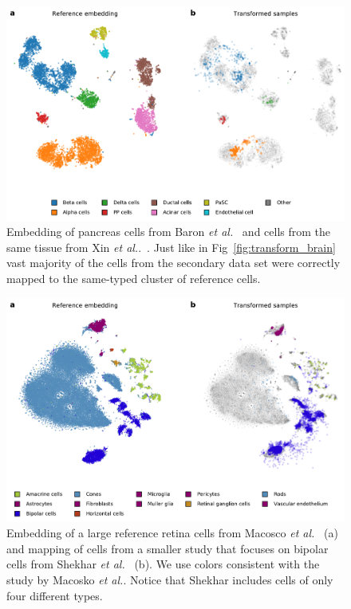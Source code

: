 \documentclass[runningheads]{llncs}
\newcommand{\etal}{\textit{et al.}}
\begin{document}
\begin{figure}[htbp]
\includegraphics[width=\textwidth]{figures/transform_pancreas.pdf}
\caption{Embedding of pancreas cells from Baron \etal~\cite{baron2016} and
cells from the same tissue from Xin \etal.~\cite{xin2016}. Just like in
Fig~\ref{fig:transform_brain} vast majority of the cells from the secondary
data set were correctly mapped to the same-typed cluster of reference
cells.}\label{fig:transform_pancreas}
\end{figure}


\begin{figure}[htbp]
\includegraphics[width=\textwidth]{figures/transform_retina.pdf}
\caption{Embedding of a large reference retina cells from Macosco
\etal~\cite{macosko2015} (a) and mapping of cells from a smaller study that
focuses on bipolar cells from Shekhar \etal~\cite{shekhar2016} (b). We use
colors consistent with the study by Macosko \etal. Notice that Shekhar includes
cells of only four different types.} \label{fig:transform_retina}
\end{figure}
\end{document}

